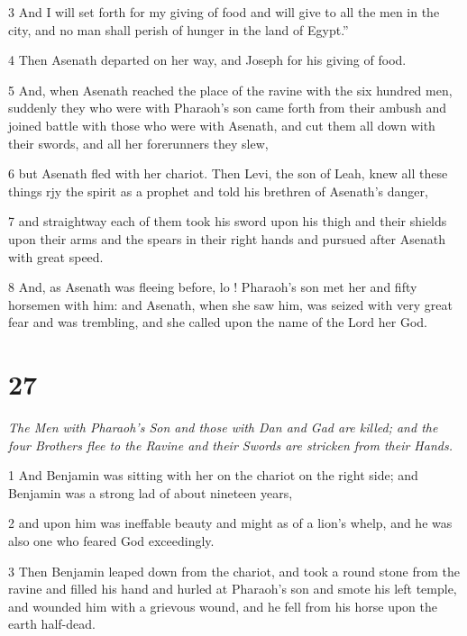 \par 3 And I will set forth for my giving of food and will give to all the men in the city, and no man shall perish of hunger in the land of Egypt.” 

\par 4 Then Asenath departed on her way, and Joseph for his giving of food. 

\par 5 And, when Asenath reached the place of the ravine with the six hundred men, suddenly they who were with Pharaoh's son came forth from their ambush and joined battle with those who were with Asenath, and cut them all down with their swords, and all her forerunners they slew, 

\par 6 but Asenath fled with her chariot. Then Levi, the son of Leah, knew all these things rjy the spirit as a prophet and told his brethren of Asenath's danger, 

\par 7 and straightway each of them took his sword upon his thigh and their shields upon their arms and the spears in their right hands and pursued after Asenath with great speed. 

\par 8 And, as Asenath was fleeing before, lo ! Pharaoh's son met her and fifty horsemen with him: and Asenath, when she saw him, was seized with very great fear and was trembling, and she called upon the name of the Lord her God. 

\chapter{27}

\par \textit{The Men with Pharaoh's Son and those with Dan and Gad are killed; and the four Brothers flee to the Ravine and their Swords are stricken from their Hands.}


\par 1 And Benjamin was sitting with her on the chariot on the right side; and Benjamin was a strong lad of about nineteen years, 

\par 2 and upon him was ineffable beauty and might as of a lion's whelp, and he was also one who feared God exceedingly. 

\par 3 Then Benjamin leaped down from the chariot, and took a round stone from the ravine and filled his hand and hurled at Pharaoh's son and smote his left temple, and wounded him with a grievous wound, and he fell from his horse upon the earth half-dead. 

